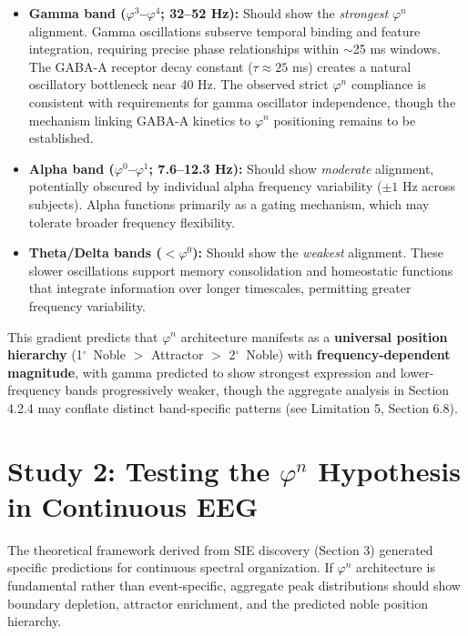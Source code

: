 \documentclass[11pt,a4paper]{article}
\newcommand{\degree}{$^\circ$}  %
\newcommand{\phisym}{\varphi}
\begin{document}
\begin{itemize}
    \item \textbf{Gamma band ($\phisym^3$--$\phisym^4$; 32--52 Hz):} Should show the \textit{strongest} $\phisym^n$ alignment. Gamma oscillations subserve temporal binding and feature integration, requiring precise phase relationships within $\sim$25 ms windows. The GABA-A receptor decay constant ($\tau \approx 25$ ms) creates a natural oscillatory bottleneck near 40 Hz. The observed strict $\phisym^n$ compliance is consistent with requirements for gamma oscillator independence, though the mechanism linking GABA-A kinetics to $\phisym^n$ positioning remains to be established.

    \item \textbf{Alpha band ($\phisym^0$--$\phisym^1$; 7.6--12.3 Hz):} Should show \textit{moderate} alignment, potentially obscured by individual alpha frequency variability ($\pm 1$ Hz across subjects). Alpha functions primarily as a gating mechanism, which may tolerate broader frequency flexibility.

    \item \textbf{Theta/Delta bands ($<\phisym^0$):} Should show the \textit{weakest} alignment. These slower oscillations support memory consolidation and homeostatic functions that integrate information over longer timescales, permitting greater frequency variability.
\end{itemize}

This gradient predicts that $\phisym^n$ architecture manifests as a \textbf{universal position hierarchy} (1\degree\ Noble $>$ Attractor $>$ 2\degree\ Noble) with \textbf{frequency-dependent magnitude}, with gamma predicted to show strongest expression and lower-frequency bands progressively weaker, though the aggregate analysis in Section 4.2.4 may conflate distinct band-specific patterns (see Limitation 5, Section 6.8).

\section{Study 2: Testing the $\phisym^n$ Hypothesis in Continuous EEG}

The theoretical framework derived from SIE discovery (Section 3) generated specific predictions for continuous spectral organization. If $\phisym^n$ architecture is fundamental rather than event-specific, aggregate peak distributions should show boundary depletion, attractor enrichment, and the predicted noble position hierarchy.
\end{document}
